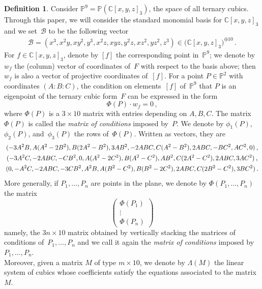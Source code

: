 \documentclass{amsart}
\theoremstyle{plain}
\theoremstyle{definition}
\newtheorem{definition}[lemma]{Definition}
\newcommand{\C}{\mathbb{C}}
\newcommand{\p}{\mathbb{P}}
\newcommand\scalemath[2]{\scalebox{#1}{\mbox{\ensuremath{\displaystyle #2}}}}
\begin{document}
\begin{definition}
\label{definition:matrix_conditions}
 Consider $\p^9 = \p(\C[x,y,z]_3)$, the space of all ternary cubics.
 Through this paper, we will consider the standard monomial basis for $\C[x,y,z]_3$ and we set~$\mathcal{B}$ to be the following vector
 \begin{eqnarray}
  \mathcal{B} = (x^3, x^2 y, x y^2, y^3, x^2 z, x y z, y^2 z, x z^2, y z^2, z^3)
  \in \bigl( \C[x,y,z]_3 \bigr)^{\oplus 10} \,.
  \label{vector_basis}
 \end{eqnarray}
 For $f \in \C[x,y,z]_3$, denote by $[f]$ the corresponding point in~$\p^9$; we denote by $w_f$ the (column) vector of coordinates of~$F$ with respect to the basis above; then $w_f$ is also a vector of projective coordinates of~$[f]$.
 For a point $P \in \p^2$ with coordinates $(A: B: C)$, the condition on elements~$[f]$ of~$\p^9$ that $P$ is an eigenpoint of the ternary cubic form~$F$ can be expressed in the form
 \[
  \Phi(P) \cdot w_f
  = 0 \,,
 \]
 where $\Phi(P)$ is a $3 \times 10$ matrix with entries depending on $A, B, C$.
 The matrix $\Phi(P)$ is called the \emph{matrix of conditions} imposed by~$P$.
We denote by $\phi_1(P)$, $\phi_2(P)$, and~$\phi_3(P)$ the rows of~$\Phi(P)$.
Written as vectors, they are
%
\begin{equation}
\label{equation:matrix_conditions_rows}
\begin{gathered}
\scalemath{0.9}{(-3A^2B, A(A^2 - 2B^2), B(2A^2 - B^2), 3AB^2,
 -2ABC, C(A^2 - B^2), 2 ABC,
 -B  C^2, A  C^2, 0)} \,, \\
\scalemath{0.9}{(-3A^2 C,
-2ABC,
-CB^2,
0,
A(A^2-2C^2),
B(A^2 - C^2),
AB^2,
C(2A^2-C^2),
2ABC,
3AC^2)} \,,\\
\scalemath{0.9}{(0,
-A^2C,
-2ABC,
-3CB^2,
A^2 B,
A(B^2 - C^2),
B(B^2-2C^2),
2ABC,
C(2B^2-C^2),
3BC^2)} \,.
\end{gathered}
\end{equation}
%
More generally, if $P_1, \dotsc, P_n$ are points in the plane, we denote by $\Phi(P_1, \dotsc, P_n)$ the matrix
%
\[
 \left(
 \begin{array}{c}
  \Phi(P_1) \\
  \vdots \\
  \Phi(P_n)
 \end{array}
 \right)
\]
%
namely, the $3n \times 10$ matrix obtained by vertically stacking the
matrices of conditions of~$P_1, \dotsc, P_n$ and we call it again the
\emph{matrix of
conditions} imposed by $P_1, \dotsc, P_n$. \\
Moreover, given a matrix $M$ of type $m \times 10$, we denote by
$\Lambda(M)$ the linear system of cubics whose coefficients
satisfy the equations associated to the matrix $M$.
\end{definition}
\end{document}
